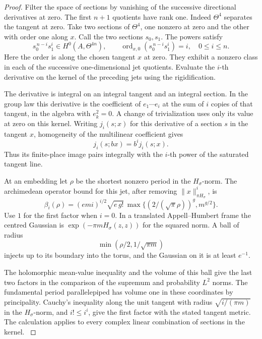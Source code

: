 \begin{proof}
Filter the space of sections by vanishing of the successive
directional derivatives at zero. The first \(n+1\) quotients have
rank one. Indeed \(\Theta^4\) separates the tangent at zero. Take two
sections of \(\Theta^4\), one nonzero at zero and the other with order
one along \(x\). Call the two sections \(s_0,s_1\). The powers satisfy
\[
 s_0^{\,n-i}s_1^i\in H^0(A,\Theta^{4n}),\qquad
          \operatorname{ord}_{x,0}(s_0^{\,n-i}s_1^i)=i,
                  \quad 0\le i\le n .
\]
Here the order is along the chosen tangent \(x\) at zero.
They exhibit a nonzero class in each of the successive
one-dimensional jet quotients.
Evaluate the \(i\)-th derivative on the kernel of the preceding
jets using the rigidification.

The derivative is integral on an integral tangent and an integral section. In the group law this derivative is the
coefficient of \(e_1\cdots e_i\) at the sum of \(i\) copies of that
tangent, in the algebra with \(e_k^2=0\). A change of trivialization
uses only its value at zero on this kernel. Writing \(j_i(s;x)\) for this derivative of a section \(s\) in the tangent \(x\), homogeneity of the multilinear coefficient gives
\[
 j_i(s;bx)=b^i j_i(s;x).
\]
Thus its finite-place image
pairs integrally with the \(i\)-th power of the saturated tangent
line.

At an embedding let \(\rho\) be the shortest nonzero period in
the \(H_\sigma\)-norm. The archimedean operator bound for this jet,
after removing \(\|x\|_{\pi H_\sigma}^i\), is
\[
  \beta_i(\rho)=(e m i)^{i/2}\sqrt{e\,g!}\,
       \max\{(2/(\sqrt\pi\rho))^g,m^{g/2}\}.
\]
Use \(1\) for the first factor when \(i=0\). In a translated
Appell--Humbert frame the centred Gaussian is
\(\exp(-\pi m H_\sigma(z,z))\) for the squared norm. A ball of
radius
\[
 \min(\rho/2,1/\sqrt{\pi m})
\]
injects up to its boundary
into the torus, and the Gaussian on it is at least \(e^{-1}\).

The holomorphic mean-value inequality and the volume of this ball
give the last two factors in the comparison of the supremum and
probability \(L^2\) norms. The fundamental period parallelepiped
has volume one in these coordinates by principality. Cauchy's
inequality along the unit tangent with radius
\(\sqrt{i/(\pi m)}\) in the \(H_\sigma\)-norm, and \(i!\le i^i\),
give the first factor with the stated tangent metric. The calculation
applies to every complex linear combination of sections in the
kernel. \label{cor:flag-point-heights-2}


\end{proof}
